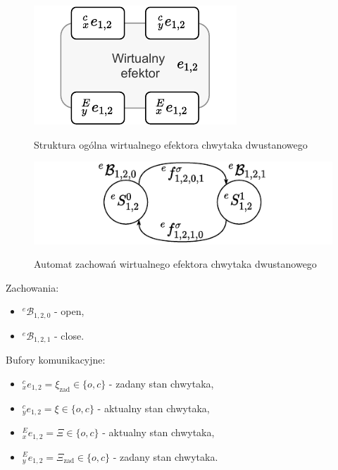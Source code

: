 \begin{figure}
    \centering
    \includegraphics[width=0.75\columnwidth]{figures/ISR-ve-gripper-model.pdf}
    \label{fig:model-ve-gripper}
    \caption{Struktura ogólna wirtualnego efektora chwytaka dwustanowego}
\end{figure}

\begin{figure}
    \centering
    \includegraphics[width=\columnwidth]{figures/ISR-ve-gripper-behaviours.pdf}
    \label{fig:zachowania-ve-gripper}
    \caption{Automat zachowań wirtualnego efektora chwytaka dwustanowego}
\end{figure}

Zachowania:
\begin{itemize}
    \item ${}^{e}\mathcal{B}_{1,2,0}$ - open,
    \item ${}^{e}\mathcal{B}_{1,2,1}$ - close.
\end{itemize}

Bufory komunikacyjne:
\begin{itemize}
    \item ${}^{c}_{x}e_{1,2} = \xi_{\mathrm{zad}} \in \{o, c\}$ - zadany stan chwytaka,
    \item ${}^{c}_{y}e_{1,2} = \xi \in \{o, c\}$ - aktualny stan chwytaka,
    \item ${}^{E}_{x}e_{1,2} = \Xi \in \{o, c\}$ - aktualny stan chwytaka,
    \item ${}^{E}_{y}e_{1,2} = \Xi_{\mathrm{zad}} \in \{o, c\}$ - zadany stan chwytaka.
\end{itemize}

